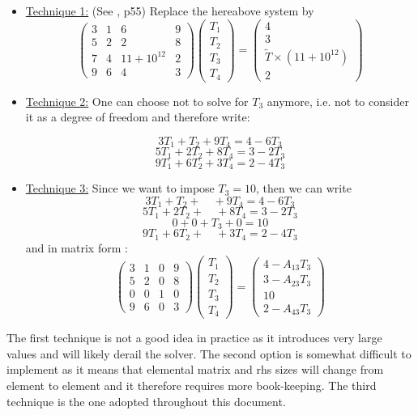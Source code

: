 \begin{itemize}

\item \underline{Technique 1:} (See \cite{smgr}, p55) Replace the hereabove system by
\[
\left(
\begin{array}{cccc}
3 & 1 & 6  & 9 \\
5 & 2 & 2  & 8 \\
7 & 4 & 11 +  10^{12} & 2 \\
9 & 6 & 4  & 3
\end{array}
\right)
\left(
\begin{array}{c}
T_1 \\ T_2 \\ T_3 \\ T_4
\end{array}
\right)
=
\left(
\begin{array}{c}
4 \\ 3 \\ \tilde{T}\times (11 + 10^{12}) \\ 2
\end{array}
\right)
\]




\item \underline{Technique 2:} One can choose not to solve for $T_3$ anymore, i.e. not to consider it as a degree of freedom and therefore write:

\[
3 T_1 + T_2 + 9 T_4 = 4 - 6T_3
\]
\[
5 T_1 + 2T_2 + 8 T_4 = 3 - 2T_3
\]
\[
9 T_1 + 6T_2 +  3 T_4 = 2 - 4T_3
\]


\item \underline{Technique 3:} Since we want to impose $T_3=10$, then we can write 
\[
3 T_1 + T_2 + \quad  + 9 T_4 = 4 - 6T_3
\]
\[
5 T_1 + 2T_2 + \quad + 8 T_4 = 3 - 2T_3
\]
\[
0 + 0 + T_3 + 0 = 10
\]
\[
9 T_1 + 6T_2 + \quad + 3 T_4 = 2 - 4T_3
\]
and in matrix form :
\[
\left(
\begin{array}{cccc}
3 & 1 & 0  & 9 \\
5 & 2 & 0  & 8 \\
0 & 0 & 1 & 0 \\
9 & 6 & 0  & 3
\end{array}
\right)
\left(
\begin{array}{c}
T_1 \\ T_2 \\ T_3 \\ T_4
\end{array}
\right)
=
\left(
\begin{array}{c}
4 - A_{13} T_3\\ 3 - A_{23}T_3 \\ 10 \\ 2-A_{43} T_3
\end{array}
\right)
\]

\end{itemize}

The first technique is not a good idea in practice as it introduces very large 
values and will likely derail the solver. The second option is somewhat difficult
to implement as it means that elemental matrix and rhs sizes will change from 
element to element and it therefore requires more book-keeping.
The third technique is the one adopted throughout this document. 


